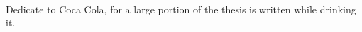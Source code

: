 \renewcommand{\baselinestretch}{2}
\small\normalsize
\hbox{\ }

\vspace{.5in}

\begin{center}
\large{Dedicate to Coca Cola, for a large portion of the thesis is written while drinking it.}
\end{center}
